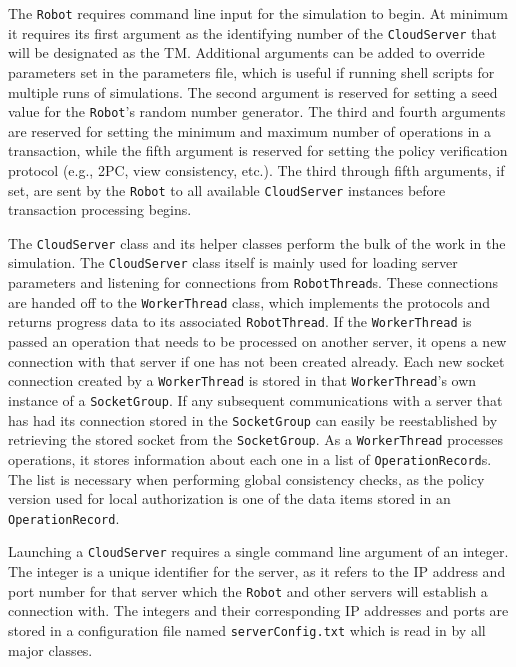 \documentclass[11pt]{article}
\begin{document}
The \texttt{Robot} requires command line input for the simulation to begin. At minimum it requires its first argument as the identifying number of the \texttt{CloudServer} that will be designated as the TM. Additional arguments can be added to override parameters set in the parameters file, which is useful if running shell scripts for multiple runs of simulations. The second argument is reserved for setting a seed value for the \texttt{Robot}'s random number generator. The third and fourth arguments are reserved for setting the minimum and maximum number of operations in a transaction, while the fifth argument is reserved for setting the policy verification protocol (e.g., 2PC, view consistency, etc.). The third through fifth arguments, if set, are sent by the \texttt{Robot} to all available \texttt{CloudServer} instances before transaction processing begins.

The \texttt{CloudServer} class and its helper classes perform the bulk of the work in the simulation. The \texttt{CloudServer} class itself is mainly used for loading server parameters and listening for connections from \texttt{RobotThread}s. These connections are handed off to the \texttt{WorkerThread} class, which implements the protocols and returns progress data to its associated \texttt{RobotThread}. If the \texttt{WorkerThread} is passed an operation that needs to be processed on another server, it opens a new connection with that server if one has not been created already. Each new socket connection created by a \texttt{WorkerThread} is stored in that \texttt{WorkerThread}'s own instance of a \texttt{SocketGroup}. If any subsequent communications with a server that has had its connection stored in the \texttt{SocketGroup} can easily be reestablished by retrieving the stored socket from the \texttt{SocketGroup}. As a \texttt{WorkerThread} processes operations, it stores information about each one in a list of \texttt{OperationRecord}s. The list is necessary when performing global consistency checks, as the policy version used for local authorization is one of the data items stored in an \texttt{OperationRecord}.

Launching a \texttt{CloudServer} requires a single command line argument of an integer. The integer is a unique identifier for the server, as it refers to the IP address and port number for that server which the \texttt{Robot} and other servers will establish a connection with. The integers and their corresponding IP addresses and ports are stored in a configuration file named \texttt{serverConfig.txt} which is read in by all major classes.
\end{document}
